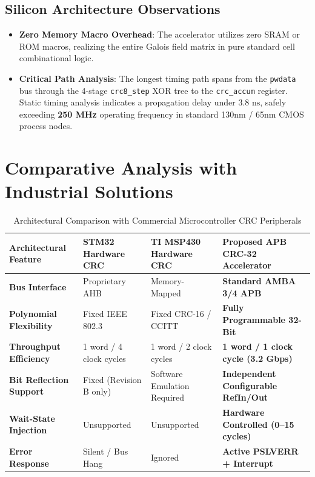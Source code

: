 \documentclass[11pt,a4paper]{article}
\begin{document}
\subsection{Silicon Architecture Observations}
\begin{itemize}
    \item \textbf{Zero Memory Macro Overhead}: The accelerator utilizes zero SRAM or ROM macros, realizing the entire Galois field matrix in pure standard cell combinational logic.
    \item \textbf{Critical Path Analysis}: The longest timing path spans from the \texttt{pwdata} bus through the 4-stage \texttt{crc8\_step} XOR tree to the \texttt{crc\_accum} register. Static timing analysis indicates a propagation delay under $3.8\text{ ns}$, safely exceeding \textbf{250 MHz} operating frequency in standard 130nm / 65nm CMOS process nodes.
\end{itemize}

\section{Comparative Analysis with Industrial Solutions}

\begin{table}[h!]
\centering
\small
\renewcommand{\arraystretch}{1.15}
\caption{Architectural Comparison with Commercial Microcontroller CRC Peripherals}
\label{tab:comparison}
\begin{tabularx}{\textwidth}{@{} l X X X @{}}
\toprule
\textbf{Architectural Feature} & \textbf{STM32 Hardware CRC} & \textbf{TI MSP430 Hardware CRC} & \textbf{Proposed APB CRC-32 Accelerator} \\
\midrule
\textbf{Bus Interface}          & Proprietary AHB             & Memory-Mapped                   & \textbf{Standard AMBA 3/4 APB} \\
\textbf{Polynomial Flexibility} & Fixed IEEE 802.3            & Fixed CRC-16 / CCITT            & \textbf{Fully Programmable 32-Bit} \\
\textbf{Throughput Efficiency}  & 1 word / 4 clock cycles     & 1 word / 2 clock cycles         & \textbf{1 word / 1 clock cycle (3.2 Gbps)} \\
\textbf{Bit Reflection Support} & Fixed (Revision B only)     & Software Emulation Required     & \textbf{Independent Configurable RefIn/Out} \\
\textbf{Wait-State Injection}   & Unsupported                 & Unsupported                     & \textbf{Hardware Controlled (0--15 cycles)} \\
\textbf{Error Response}         & Silent / Bus Hang           & Ignored                         & \textbf{Active PSLVERR + Interrupt} \\
\bottomrule
\end{tabularx}
\end{table}
\end{document}
